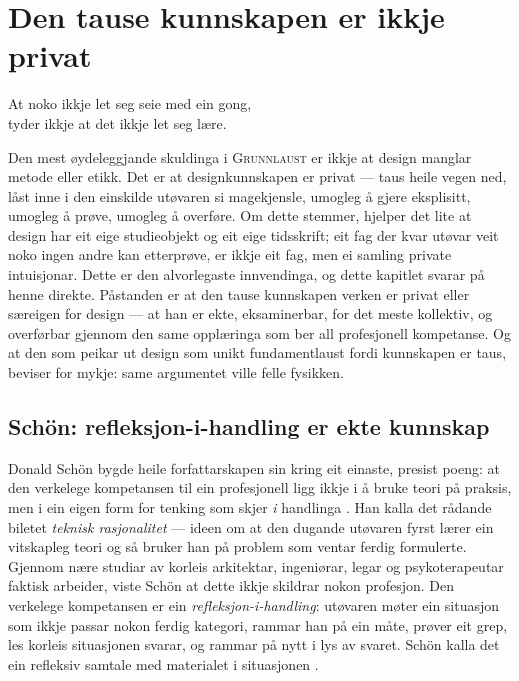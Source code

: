 \chapter{Den tause kunnskapen er ikkje privat}

\begin{motto}
At noko ikkje let seg seie med ein gong,\\ tyder ikkje at det ikkje let seg lære.
\end{motto}

Den mest øydeleggjande skuldinga i \textsc{Grunnlaust} er ikkje at design manglar metode eller etikk. Det er at designkunnskapen er privat — taus heile vegen ned, låst inne i den einskilde utøvaren si magekjensle, umogleg å gjere eksplisitt, umogleg å prøve, umogleg å overføre. Om dette stemmer, hjelper det lite at design har eit eige studieobjekt og eit eige tidsskrift; eit fag der kvar utøvar veit noko ingen andre kan etterprøve, er ikkje eit fag, men ei samling private intuisjonar. Dette er den alvorlegaste innvendinga, og dette kapitlet svarar på henne direkte. Påstanden er at den tause kunnskapen verken er privat eller særeigen for design — at han er ekte, eksaminerbar, for det meste kollektiv, og overførbar gjennom den same opplæringa som ber all profesjonell kompetanse. Og at den som peikar ut design som unikt fundamentlaust fordi kunnskapen er taus, beviser for mykje: same argumentet ville felle fysikken.

\section{Schön: refleksjon-i-handling er ekte kunnskap}

Donald Schön bygde heile forfattarskapen sin kring eit einaste, presist poeng: at den verkelege kompetansen til ein profesjonell ligg ikkje i å bruke teori på praksis, men i ein eigen form for tenking som skjer \emph{i} handlinga \autocite{schon1983}. Han kalla det rådande biletet \emph{teknisk rasjonalitet} — ideen om at den dugande utøvaren fyrst lærer ein vitskapleg teori og så bruker han på problem som ventar ferdig formulerte. Gjennom nære studiar av korleis arkitektar, ingeniørar, legar og psykoterapeutar faktisk arbeider, viste Schön at dette ikkje skildrar nokon profesjon. Den verkelege kompetansen er ein \emph{refleksjon-i-handling}: utøvaren møter ein situasjon som ikkje passar nokon ferdig kategori, rammar han på ein måte, prøver eit grep, les korleis situasjonen svarar, og rammar på nytt i lys av svaret. Schön kalla det ein refleksiv samtale med materialet i situasjonen \autocite{schon1992designing}.

